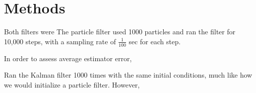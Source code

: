 \section{Methods} \label{sec:methods}


Both filters were The particle filter used 1000 particles and ran the filter for
10,000 steps, with a sampling rate of $\frac{1}{100}$ sec for each
step. 

In order to assess average estimator error, 

Ran the Kalman filter 1000 times with the same initial conditions,
much like how we would initialize a particle filter. However, 
